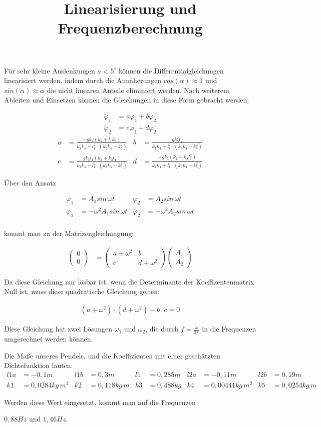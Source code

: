 \documentclass[a3paper, 12pt, landscape]{article}
\title{\vspace{-4cm}\fontsize{96pt}{100pt}\selectfont Linearisierung und Frequenzberechnung}
\author{ }
\date{ }
\newcommand{\mathematik}{\begin{equation*}\begin{aligned}}
\newcommand{\mathematikstop}{\end{aligned}\end{equation*}}
\renewcommand{\phi}{\varphi} %
\newcommand{\phidd}{\ddot{\phi}}  %
\begin{document}
\LARGE
\maketitle
\begin{multicols}{2}


Für sehr kleine Auslenkungen $a < 5^\circ$ können die Differentialgleichungen linearisiert werden, indem durch die Annäherungen $cos(\alpha) \approx 1$ und $sin(\alpha) \approx \alpha$ die nicht linearen Anteile eliminiert werden.
Nach weiterem Ableiten und Einsetzen können die Gleichungen in diese Form gebracht werden:

\mathematik
\phidd_1 &= a \phi_1 + b \phi_2\\
\phidd_2 &= c \phi_1 + d \phi_2
\mathematikstop
\mathematik
a &= \frac{-g k_4 (k_2 + l_1 k_3)}{k_1 k_4 + l_1^2 \cdot (k_3 k_4 - k_5^2)}
& b &= \frac{g k_5^2 l_1}{k_1 k_4 + l_1^2 \cdot (k_3 k_4 - k_5^2)}\\
c &= \frac{g k_5 l_1 (k_2 + k_3 l_1)}{k_1 k_4 + l_1^2 \cdot (k_3 k_4 - k_5^2)}
& d &= \frac{-g k_5 (k_1 + k_3 l_1^2)}{k_1 k_4 + l_1^2 \cdot (k_3 k_4 - k_5^2)}
\mathematikstop

Über den Ansatz

\mathematik
\phi_1 &= A_1 sin\, \omega t
& \phi_2 &= A_2 sin\, \omega t \\
\phidd_1 &= - \omega^2 A_1 sin\, \omega t
& \phidd_2 &= - \omega^2 A_2 sin\, \omega t \\
\mathematikstop

kommt man zu der Matrizengleichungung:

\mathematik
\begin{pmatrix}0 \\ 0\end{pmatrix} &=
\begin{pmatrix}
a+\omega^2 & b\\
c & d+\omega^2
\end{pmatrix}
\begin{pmatrix}A_1 \\ A_2\end{pmatrix}
\mathematikstop

Da diese Gleichung nur lösbar ist, wenn die Determinante der Koeffizentenmatrix Null ist, muss diese quadratische Gleichung gelten:

\mathematik
(a + \omega^2) \cdot (d + \omega^2) - b \cdot c = 0
\mathematikstop

Diese Gleichung hat zwei Lösungen $\omega_1$ und $\omega_2$, die durch $f=\frac{\omega}{2\pi}$ in die Frequenzen umgerechnet werden können.

Die Maße unseres Pendels, und die Koeffizienten mit einer geschätzten Dichtefunktion lauten:
\mathematik
l1a &= -0,1m & l1b &= 0,3m & l1 &= 0,285m & l2a &= -0,11m & l2b &= 0,19m\\
k1 &= 0,0284 kg\,m^2 & k2 &= 0,118 kg\,m & k3 &= 0,488 kg & k4 &= 0,00441kg\,m^2 & k5 &= 0,0254kg\,m
\mathematikstop

Werden diese Wert eingesetzt, kommt man auf die Frequenzen
\begin{center}
  $0,88 Hz$ und $1,46 Hz$.
\end{center}

\end{multicols}
\end{document}
